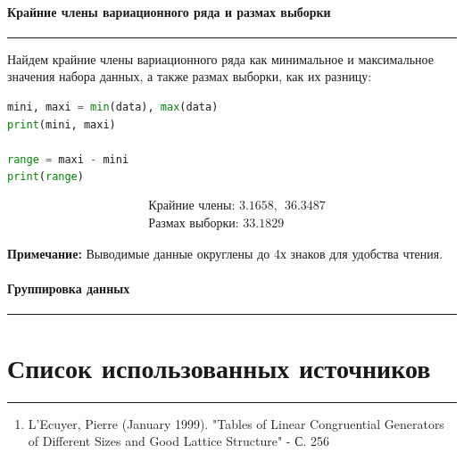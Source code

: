 \documentclass[a4paper, 14pt]{extarticle}
\begin{document}
\paragraph{Крайние члены вариационного ряда и размах выборки}\vspace{-20pt}\rule{\linewidth}{0.1mm}

Найдем крайние члены вариационного ряда как минимальное и максимальное значения 
набора данных, а также размах выборки, как их разницу:

\vspace{10pt}

\begin{lstlisting}[language=Python]
mini, maxi = min(data), max(data)
print(mini, maxi)

range = maxi - mini
print(range)
\end{lstlisting}

\vspace{-5pt}

\begin{align*}
  & \text{Крайние члены: }  3.1658, \hspace{5pt} 36.3487 \\
  & \text{Размах выборки: }  33.1829
\end{align*}

{\footnotesize \textbf{Примечание:} Выводимые данные округлены до 4х знаков для удобства чтения.}

\paragraph{Группировка данных}\vspace{-20pt}\rule{\linewidth}{0.1mm}



\newpage
\section{Список использованных источников}\vspace{-20pt}\rule{\linewidth}{0.1mm}
\begin{enumerate}
  \item \label{item:source1} L'Ecuyer, Pierre (January 1999). "Tables of Linear Congruential Generators of Different Sizes and Good Lattice Structure" - С. 256
\end{enumerate}
\end{document}
